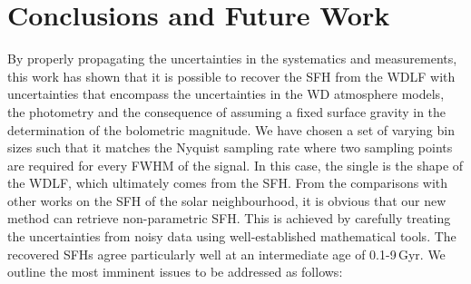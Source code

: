\documentclass[fleqn,usenatbib]{mnras}
\begin{document}
\section{Conclusions and Future Work}
\label{sec:conclusion}
By properly propagating the uncertainties in the systematics and measurements,
this work has shown that it is possible to recover the SFH 
from the WDLF with uncertainties that encompass the uncertainties in the WD
atmosphere models, the photometry and the consequence of assuming a fixed
surface gravity in the determination of the bolometric magnitude. We have chosen
a set of varying bin sizes such that it matches the Nyquist sampling rate where
two sampling points are required for every FWHM of the signal. In this case,
the single is the shape of the WDLF, which ultimately comes from the SFH. From
the comparisons with other works on the SFH of the solar neighbourhood, it is
obvious that our new method can retrieve non-parametric SFH. This is achieved by
carefully treating the uncertainties from noisy data using well-established
mathematical tools. The recovered SFHs agree particularly well at an
intermediate age of 0.1-9\,Gyr. We outline the most imminent issues to be
addressed as follows:

\end{document}
